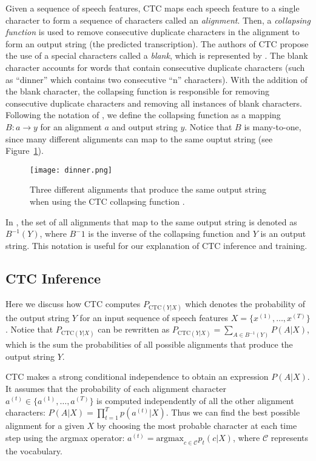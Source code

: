 Given a sequence of speech features, CTC maps each speech feature to a single character to form a sequence of characters called an \emph{alignment}. 
Then, a \emph{collapsing function} is used to remove consecutive duplicate characters in the alignment to form an output string (the predicted transcription).
The authors of CTC propose the use of a special characters called a \emph{blank}, which is represented by \textvisiblespace.
The blank character accounts for words that contain consecutive duplicate characters (such as ``dinner'' which contains two consecutive ``n'' characters).
With the addition of the blank character, the collapsing function is responsible for removing consecutive duplicate characters and removing all instances of blank characters.
Following the notation of \cite{jurafskyspeech}, we define the collapsing function as a mapping $B: a \rightarrow y$ for an alignment $a$ and output string $y$.
Notice that $B$ is many-to-one, since many different alignments can map to the same ouptut string (see Figure~\ref{dinner}).

\begin{figure}
    \centering
    \captionsetup{justification=centering}
    \texttt{[image: dinner.png]}
    \caption{Three different alignments that produce the same output string when using the CTC collapsing function \cite{jurafskyspeech}.}
    \label{dinner}
\end{figure}

In \cite{jurafskyspeech}, the set of all alignments that map to the same output string is denoted as $B^{-1}(Y)$, 
where $B^-1$ is the inverse of the collapsing function and $Y$ is an output string.
This notation is useful for our explanation of CTC inference and training.

\subsection{CTC Inference}
Here we discuss how CTC computes $P_{\text{CTC}(Y|X)}$ which denotes the probability of 
the output string $Y$ for an input sequence of speech features $X = \{x^{(1)}, \dots, x^{(T)}\}$.
Notice that $P_{\text{CTC}(Y|X)}$ can be rewritten as $P_{\text{CTC}(Y|X)} = \sum\limits_{A \in B^{-1}(Y)} P(A|X)$, 
which is the sum the probabilities of all possible alignments that produce the output string $Y$.

CTC makes a strong conditional independence to obtain an expression $P(A|X)$. 
It assumes that the probability of each alignment character $a^{(t)} \in \{a^{(1)}, \dots, a^{(T)}\}$
is computed independently of all the other alignment characters: $P(A|X) = \prod\limits_{t=1}^{T} p(a^{(t)} | X)$.
Thus we can find the best possible alignment for a given $X$ by choosing the most probable character at each time step
using the argmax operator: $a^{(t)} = \text{argmax}_{c \in \mathcal{C}} p_{t}(c|X)$, where $\mathcal{C}$ represents the
vocabulary.

